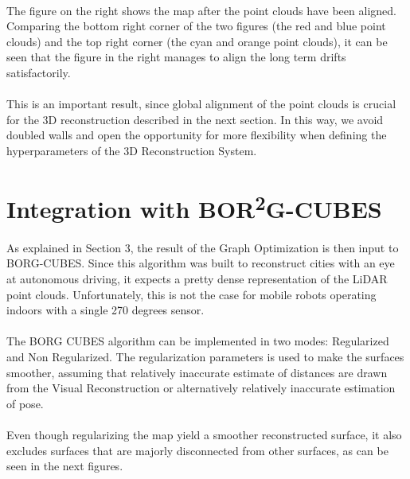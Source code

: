 \documentclass[12pt]{article}
\begin{document}
	\paragraph{}
	The figure on the right shows the map after the point clouds have been aligned. Comparing the bottom right corner of the two figures (the red and blue point clouds) and the top right corner (the cyan and orange point clouds), it can be seen that the figure in the right manages to align the long term drifts satisfactorily.
	
	\paragraph{}
	This is an important result, since global alignment of the point clouds is crucial for the 3D reconstruction described in the next section. In this way, we avoid doubled walls and open the opportunity for more flexibility when defining the hyperparameters of the 3D Reconstruction System.
	
	\newpage
	\section{Integration with BOR\textsuperscript{2}G-CUBES}
	\label{sec:Borg}
	\paragraph{}
	As explained in Section 3, the result of the Graph Optimization is then input to BORG-CUBES. Since this algorithm was built to reconstruct cities with an eye at autonomous driving, it expects a pretty dense representation of the LiDAR point clouds. Unfortunately, this is not the case for mobile robots operating indoors with a single 270 degrees sensor.
	
	\paragraph{}
	The BORG CUBES algorithm can be implemented in two modes: Regularized and Non Regularized. The regularization parameters is used to make the surfaces smoother, assuming that relatively inaccurate estimate of distances are drawn from the Visual Reconstruction or alternatively relatively inaccurate estimation of pose.
	
	\paragraph{}
	Even though regularizing the map yield a smoother reconstructed surface, it also excludes surfaces that are majorly disconnected from other surfaces, as can be seen in the next figures.
	
\end{document}
